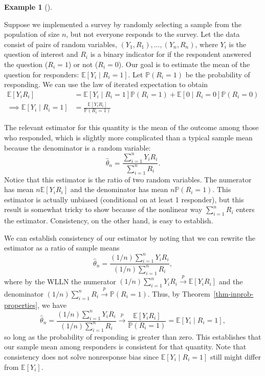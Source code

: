 \documentclass[
  13pt,
  letterpaper,
  DIV=11,
  numbers=noendperiod]{scrreprt}
\newcommand{\E}{\mathbb{E}}
\renewcommand{\P}{\mathbb{P}}
\newcommand{\inprob}{\overset{p}{\to}}
\theoremstyle{plain}
\theoremstyle{plain}
\theoremstyle{definition}
\theoremstyle{definition}
\newtheorem{example}{Example}[chapter]
\theoremstyle{remark}
\begin{document}
\begin{example}[]\protect\hypertarget{exm-nonresponse}{}\label{exm-nonresponse}

Suppose we implemented a survey by randomly selecting a sample from the
population of size \(n\), but not everyone responds to the survey. Let
the data consist of pairs of random variables,
\((Y_1, R_1), \ldots, (Y_n, R_n)\), where \(Y_i\) is the question of
interest and \(R_i\) is a binary indicator for if the respondent
answered the question (\(R_i = 1\)) or not (\(R_i = 0\)). Our goal is to
estimate the mean of the question for responders:
\(\E[Y_i \mid R_i = 1]\). Let \(\P(R_i = 1)\) be the probability of
responding. We can use the law of iterated expectation to obtain \[
\begin{aligned}
\E[Y_iR_i] &= \E[Y_i \mid R_i = 1]\P(R_i = 1) + \E[ 0 \mid R_i = 0]\P(R_i = 0) \\
\implies \E[Y_i \mid R_i = 1] &= \frac{\E[Y_iR_i]}{\P(R_i = 1)}
\end{aligned}
\]

The relevant estimator for this quantity is the mean of the outcome
among those who responded, which is slightly more complicated than a
typical sample mean because the denominator is a random variable: \[
\widehat{\theta}_n = \frac{\sum_{i=1}^n Y_iR_i}{\sum_{i=1}^n R_i}. 
\] Notice that this estimator is the ratio of two random variables. The
numerator has mean \(n\E[Y_iR_i]\) and the denominator has mean
\(n\P(R_i = 1)\). This estimator is actually unbiased (conditional on at
least 1 responder), but this result is somewhat tricky to show because
of the nonlinear way \(\sum_{i=1}^n R_i\) enters the estimator.
Consistency, on the other hand, is easy to establish.

We can establish consistency of our estimator by noting that we can
rewrite the estimator as a ratio of sample means \[
\widehat{\theta}_n = \frac{(1/n)\sum_{i=1}^n Y_iR_i}{(1/n)\sum_{i=1}^n R_i},
\] where by the WLLN the numerator
\((1/n)\sum_{i=1}^n Y_iR_i \inprob \E[Y_iR_i]\) and the denominator
\((1/n)\sum_{i=1}^n R_i \inprob \P(R_i = 1)\). Thus, by
Theorem~\ref{thm-inprob-properties}, we have \[
\widehat{\theta}_n = \frac{(1/n)\sum_{i=1}^n Y_iR_i}{(1/n)\sum_{i=1}^n R_i} \inprob \frac{\E[Y_iR_i]}{\P(R_i = 1)} = \E[Y_i \mid R_i = 1],
\] so long as the probability of responding is greater than zero. This
establishes that our sample mean among responders is consistent for that
quantity. Note that consistency does not solve nonresponse bias since
\(\E[Y_i \mid R_i = 1]\) still might differ from \(\E[Y_i]\).

\end{example}
\end{document}
